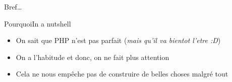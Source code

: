 \begin{frameC}{Bref\ldots}

\end{frameC}

\begin{frame}{Pourquoi}{In a nutshell}
    \begin{itemize}[<+->]
        \item On sait que PHP n'est pas parfait \pause[\thebeamerpauses] (\textit{mais qu'il va bientot l'etre :D})\pause[\thebeamerpauses]
        \item On a l'habitude et donc, on ne fait plus attention
        \item Cela ne nous empêche pas de construire de belles choses malgré tout
    \end{itemize}
\end{frame}
